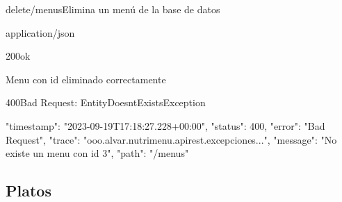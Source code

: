 \begin{apiRoute}{delete}{/menus}{Elimina un menú de la base de datos}
	\begin{routeParameter}
	\end{routeParameter}
	\begin{routeResponse}{application/json}
		\begin{routeResponseItem}{200}{ok}
			\begin{routeResponseItemBody}
Menu con id eliminado correctamente	
			\end{routeResponseItemBody}
		\end{routeResponseItem}
		
\begin{routeResponseItem}{400}{Bad Request: EntityDoesntExistsException}
			\begin{routeResponseItemBody}
{
    "timestamp": "2023-09-19T17:18:27.228+00:00",
    "status": 400,
    "error": "Bad Request",
    "trace": "ooo.alvar.nutrimenu.apirest.excepciones...",
    "message": "No existe un menu con id 3",
    "path": "/menus"
}
			\end{routeResponseItemBody}
		\end{routeResponseItem}
		
	\end{routeResponse}
\end{apiRoute}

\subsection{Platos}

